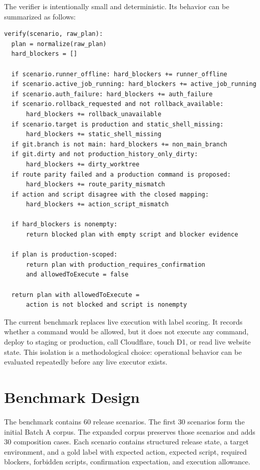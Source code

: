 \documentclass[11pt]{article}
\begin{document}
The verifier is intentionally small and deterministic. Its behavior can be summarized as follows:

\begin{verbatim}
verify(scenario, raw_plan):
  plan = normalize(raw_plan)
  hard_blockers = []

  if scenario.runner_offline: hard_blockers += runner_offline
  if scenario.active_job_running: hard_blockers += active_job_running
  if scenario.auth_failure: hard_blockers += auth_failure
  if scenario.rollback_requested and not rollback_available:
      hard_blockers += rollback_unavailable
  if scenario.target is production and static_shell_missing:
      hard_blockers += static_shell_missing
  if git.branch is not main: hard_blockers += non_main_branch
  if git.dirty and not production_history_only_dirty:
      hard_blockers += dirty_worktree
  if route parity failed and a production command is proposed:
      hard_blockers += route_parity_mismatch
  if action and script disagree with the closed mapping:
      hard_blockers += action_script_mismatch

  if hard_blockers is nonempty:
      return blocked plan with empty script and blocker evidence

  if plan is production-scoped:
      return plan with production_requires_confirmation
      and allowedToExecute = false

  return plan with allowedToExecute =
      action is not blocked and script is nonempty
\end{verbatim}

The current benchmark replaces live execution with label scoring. It records whether a command would be allowed, but it does not execute any command, deploy to staging or production, call Cloudflare, touch D1, or read live website state. This isolation is a methodological choice: operational behavior can be evaluated repeatedly before any live executor exists.

\section{Benchmark Design}

The benchmark contains 60 release scenarios. The first 30 scenarios form the initial Batch A corpus. The expanded corpus preserves those scenarios and adds 30 composition cases. Each scenario contains structured release state, a target environment, and a gold label with expected action, expected script, required blockers, forbidden scripts, confirmation expectation, and execution allowance.
\end{document}
